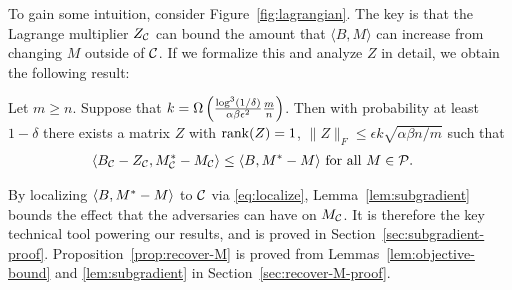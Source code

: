 


To gain some intuition, consider 
Figure~\ref{fig:lagrangian}. The key is that the Lagrange 
multiplier $Z_{\mathcal{C}}$ can bound the amount that $\langle B, M \rangle$ 
can increase from changing $M$ outside of $\mathcal{C}$.
If we formalize this and analyze $Z$ in detail, we obtain the 
following result:
\begin{lemma}
\label{lem:subgradient}
Let $m \geq n$. Suppose that $k = \Omega\left( \frac{\log^3(1/\delta)}{\alpha\beta\epsilon^2}\frac{m}{n} \right)$. 
Then with probability at least $1-\delta$ there exists a matrix $Z$ with 
$\operatorname{rank}(Z) = 1$, $\|Z\|_F \leq \epsilon k\sqrt{\alpha\beta n/m}$ such that
\begin{align}
\label{eq:localize}
\langle B_{\mathcal{C}} - Z_{\mathcal{C}}, M^*_{\mathcal{C}} - M_{\mathcal{C}} \rangle &\leq \langle B, M^* - M \rangle \text{ for all $M \in \mathcal{P}$}.
\end{align}
\end{lemma}
By localizing $\langle B, M^* - M \rangle$ to $\mathcal{C}$ via 
\eqref{eq:localize}, 
Lemma~\ref{lem:subgradient} bounds the effect that the adversaries can have 
on $M_{\mathcal{C}}$. It is therefore the key 
technical tool powering our results, and is proved in 
Section~\ref{sec:subgradient-proof}. Proposition~\ref{prop:recover-M} 
is proved from Lemmas~\ref{lem:objective-bound} and \ref{lem:subgradient} 
in Section~\ref{sec:recover-M-proof}.

